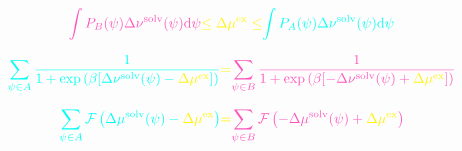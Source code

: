\documentclass{article}
\begin{document}
\begin{equation}
    \textcolor{pink}{\int P_B(\psi) \Delta\nu^{\mathrm{solv}}(\psi) \mathrm{d}\psi} \textcolor{yellow}{\le \Delta \mu^{\mathrm{ex}} \le} \textcolor{cyan}{\int P_A(\psi)\Delta \nu^{\mathrm{solv}}(\psi) \mathrm{d}\psi}
\end{equation}

\begin{equation}
    \textcolor{cyan}{\sum_{\psi\in A} \frac{1}{1+\exp\left({\beta[\Delta\nu^{\text{solv}}(\psi)-\textcolor{yellow}{\Delta\mu^{\text{ex}}}]}\right)}} \textcolor{yellow}{=} \textcolor{pink}{\sum_{\psi\in B} \frac{1}{1+\exp\left({\beta[-\Delta\nu^{\text{solv}}(\psi)+\textcolor{yellow}{\Delta\mu^{\text{ex}}}]}\right)}}
\end{equation}

\begin{equation}
    \textcolor{cyan}{\sum_{\psi\in A} \mathcal{F}\left( \Delta \mu^{\text{solv}}(\psi)-\textcolor{yellow}{\Delta\mu^{\text{ex}}} \right)} \textcolor{yellow}{=} \textcolor{pink}{\sum_{\psi\in B} \mathcal{F}\left( -\Delta \mu^{\text{solv}}(\psi)+\textcolor{yellow}{\Delta\mu^{\text{ex}}} \right)}
\end{equation}
\end{document}
